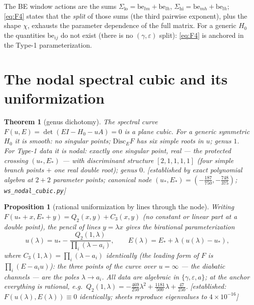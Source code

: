 \documentclass[11pt]{article}
\newtheorem{theorem}{Theorem}
\newtheorem{proposition}{Proposition}
\theoremstyle{definition}
\theoremstyle{remark}
\newcommand{\eps}{\varepsilon}
\newcommand{\be}{\mathrm{be}}
\newcommand{\lo}{\mathrm{lo}}
\newcommand{\hi}{\mathrm{hi}}
\newcommand{\evidence}[1]{\textnormal{\small[\textit{#1}]}}
\begin{document}
The BE window actions are the sums $\Sigma_\lo=\be_{lm}+\be_{lh}$,
$\Sigma_\hi=\be_{mh}+\be_{lh}$; \eqref{eq:F4} states that the \emph{split} of those sums
(the third pairwise exponent), plus the shape $\chi$, exhausts the parameter dependence
of the full matrix. For a generic $H_0$ the quantities $\be_{ij}$ do not exist (there is
no $(\gamma,\eps)$ split): \eqref{eq:F4} is anchored in the Type-1 parameterization.

\section{The nodal spectral cubic and its uniformization}\label{sec:cubic}

\begin{theorem}[genus dichotomy]\label{thm:cubic}
The spectral curve $F(u,E)=\det(EI-H_0-uA)=0$ is a plane cubic. For a generic symmetric
$H_0$ it is \emph{smooth}: no singular points; $\mathrm{Disc}_EF$ has six simple roots
in $u$; genus $1$. For Type-1 data it is \emph{nodal}: exactly one singular point,
real --- the protected crossing $(u_*,E_*)$ --- with discriminant structure
$[2,1,1,1,1]$ (four simple branch points $+$ one real double root); genus $0$.
\evidence{established by exact polynomial algebra at $2+2$ parameter points; canonical
node $(u_*,E_*)=(-\tfrac{187}{750},-\tfrac{748}{375})$; \texttt{ws\_nodal\_cubic.py}}
\end{theorem}

\begin{proposition}[rational uniformization by lines through the node]\label{prop:unif}
Writing $F(u_*+x,E_*+y)=Q_2(x,y)+C_3(x,y)$ (no constant or linear part at a double
point), the pencil of lines $y=\lambda x$ gives the birational parameterization
\begin{equation}\label{eq:unif}
u(\lambda)=u_*-\frac{Q_2(1,\lambda)}{\prod_i(\lambda-a_i)},\qquad
E(\lambda)=E_*+\lambda\,(u(\lambda)-u_*),
\end{equation}
where $C_3(1,\lambda)=\prod_i(\lambda-a_i)$ \emph{identically} (the leading form of $F$
is $\prod_i(E-a_iu)$): the three points of the curve over $u=\infty$ --- the diabatic
channels --- are the poles $\lambda\to a_i$. All data are algebraic in
$\{\gamma,\eps,a\}$; at the anchor everything is rational, e.g.\
$Q_2(1,\lambda)=-\tfrac{469}{250}\lambda^2+\tfrac{1181}{500}\lambda+\tfrac{47}{250}$.
\evidence{established: $F(u(\lambda),E(\lambda))\equiv0$ identically; sheets reproduce
eigenvalues to $4\times10^{-16}$}
\end{proposition}
\end{document}
